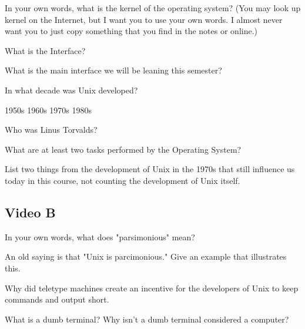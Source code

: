 \documentclass[letterpaper,12pt]{exam}
\begin{document}
\begin{questions}
	\question  In your own words, what is the kernel of the operating system? (You may look up kernel on the Internet, but I want you to use your own words.  I almost never want you to just copy something that you find in the notes or online.)
	\vspace{1.5cm}

	\question What is the Interface? 
	\vspace{1.5cm}	

	\question What is the main interface we will be leaning this semester? 
	\vspace{1.5cm}

	\question In what decade was Unix developed?
	\begin{checkboxes}
	\choice 1950s
	\choice 1960s
	\choice 1970s
	\choice 1980s
	\end{checkboxes}

	\question Who was Linus Torvalds? 
	\vspace{1.0cm}

\question  What are at least two tasks performed by the Operating System?
\vspace{1.5cm}

\question List two things from the development of Unix in the 1970s that still influence us today in this course, not counting the development of Unix itself.
\begin{checkboxes}
\choice {\Huge \textcolor{white}{X}} 
\choice {\Huge \textcolor{white}{X}}
\end{checkboxes}

\subsection*{Video B}

\question In your own words, what does "parsimonious" mean? 
\vspace{1.5cm}

\question An old saying is that "Unix is parcimonious." Give an example that illustrates this. 
\vspace{1.5cm}

\question Why did teletype machines create an incentive for the developers of Unix to keep commands and output short. 
\vspace{1.5cm}

\question What is a dumb terminal? Why isn't a dumb terminal considered a computer?
\vspace{1.5cm}


\end{questions}
\end{document}
